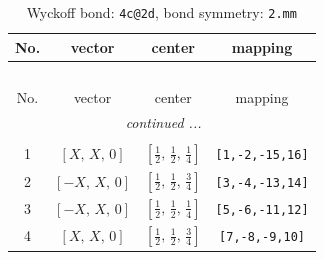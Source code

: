 \documentclass[fleqn,8pt]{jsarticle}
\begin{document}
\renewcommand{\arraystretch}{1.2}
\begin{longtable}{cccc}
\caption{Wyckoff bond: {\tt 4c@2d}, bond symmetry: {\tt 2.mm}}
 \\
 \hline \hline
No. & vector & center & mapping \\ \hline \endfirsthead

\multicolumn{3}{l}{\tablename\ \thetable{}} \\
 \hline \hline
No. & vector & center & mapping \\ \hline \endhead

 \hline \hline
\multicolumn{3}{r}{\footnotesize\it continued ...} \\ \endfoot

 \hline \hline
\multicolumn{3}{r}{} \\ \endlastfoot

1 & $\left[ X,\, X,\, 0 \right]$ & $\left[ \frac{1}{2},\, \frac{1}{2},\, \frac{1}{4} \right]$ & {\tt [1,-2,-15,16]} \\ \hline
2 & $\left[ - X,\, X,\, 0 \right]$ & $\left[ \frac{1}{2},\, \frac{1}{2},\, \frac{3}{4} \right]$ & {\tt [3,-4,-13,14]} \\ \hline
3 & $\left[ - X,\, X,\, 0 \right]$ & $\left[ \frac{1}{2},\, \frac{1}{2},\, \frac{1}{4} \right]$ & {\tt [5,-6,-11,12]} \\ \hline
4 & $\left[ X,\, X,\, 0 \right]$ & $\left[ \frac{1}{2},\, \frac{1}{2},\, \frac{3}{4} \right]$ & {\tt [7,-8,-9,10]} \\
\end{longtable}
\renewcommand{\arraystretch}{1.2}
\end{document}
